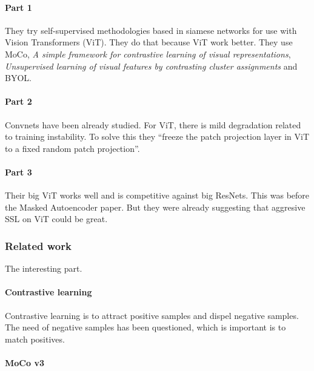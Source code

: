 \documentclass[
]{article}
\begin{document}
\hypertarget{part-1}{%
\paragraph{Part 1}\label{part-1}}

They try self-supervised methodologies based in siamese networks for use
with Vision Transformers (ViT). They do that because ViT work better.
They use MoCo, \emph{A simple framework for contrastive learning of
visual representations}, \emph{Unsupervised learning of visual features
by contrasting cluster assignments} and BYOL.

\hypertarget{part-2}{%
\paragraph{Part 2}\label{part-2}}

Convnets have been already studied. For ViT, there is mild degradation
related to training instability. To solve this they ``freeze the patch
projection layer in ViT to a fixed random patch projection''.

\hypertarget{part-3}{%
\paragraph{Part 3}\label{part-3}}

Their big ViT works well and is competitive against big ResNets. This
was before the Masked Autoencoder paper. But they were already
suggesting that aggresive SSL on ViT could be great.

\hypertarget{related-work}{%
\subsubsection{Related work}\label{related-work}}

The interesting part.

\hypertarget{contrastive-learning}{%
\paragraph{Contrastive learning}\label{contrastive-learning}}

Contrastive learning is to attract positive samples and dispel negative
samples. The need of negative samples has been questioned, which is
important is to match positives.

\hypertarget{moco-v3}{%
\paragraph{MoCo v3}\label{moco-v3}}
\end{document}
